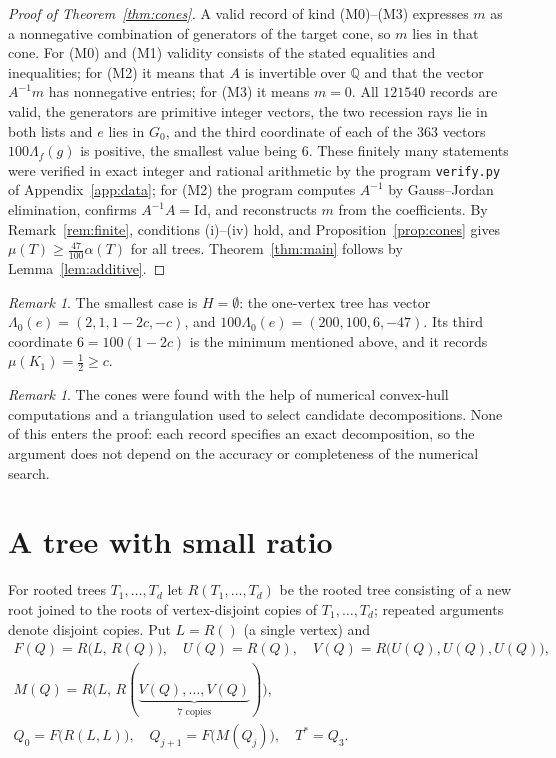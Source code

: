 \documentclass{amsart}
\numberwithin{equation}{section}
\theoremstyle{plain}
\theoremstyle{definition}
\theoremstyle{remark}
\newtheorem{remark}[theorem]{Remark}
\begin{document}
\begin{proof}[Proof of Theorem~\textup{\ref{thm:cones}}]
A valid record of kind (M0)--(M3) expresses $m$ as a nonnegative combination of generators of the target cone, so $m$ lies in that cone. For (M0) and (M1) validity consists of the stated equalities and inequalities; for (M2) it means that $A$ is invertible over $\mathbb Q$ and that the vector $A^{-1}m$ has nonnegative entries; for (M3) it means $m=0$. All $121540$ records are valid, the generators are primitive integer vectors, the two recession rays lie in both lists and $e$ lies in $G_0$, and the third coordinate of each of the $363$ vectors $100\Lambda_f(g)$ is positive, the smallest value being $6$. These finitely many statements were verified in exact integer and rational arithmetic by the program \texttt{verify.py} of Appendix~\ref{app:data}; for (M2) the program computes $A^{-1}$ by Gauss--Jordan elimination, confirms $A^{-1}A=\mathrm{Id}$, and reconstructs $m$ from the coefficients. By Remark~\ref{rem:finite}, conditions (i)--(iv) hold, and Proposition~\ref{prop:cones} gives $\mu(T)\ge\frac{47}{100}\alpha(T)$ for all trees. Theorem~\ref{thm:main} follows by Lemma~\ref{lem:additive}.
\end{proof}

\begin{remark}\label{rem:example}
The smallest case is $H=\emptyset$: the one-vertex tree has vector $\Lambda_0(e)=(2,1,1-2c,-c)$, and $100\Lambda_0(e)=(200,100,6,-47)$. Its third coordinate $6=100(1-2c)$ is the minimum mentioned above, and it records $\mu(K_1)=\frac12\ge c$.
\end{remark}

\begin{remark}
The cones were found with the help of numerical convex-hull computations and a triangulation used to select candidate decompositions. None of this enters the proof: each record specifies an exact decomposition, so the argument does not depend on the accuracy or completeness of the numerical search.
\end{remark}

\section{A tree with small ratio}\label{sec:witness}

For rooted trees $T_1,\dots,T_d$ let $R(T_1,\dots,T_d)$ be the rooted tree consisting of a new root joined to the roots of vertex-disjoint copies of $T_1,\dots,T_d$; repeated arguments denote disjoint copies. Put $L=R()$ (a single vertex) and
\begin{equation}\label{eq:witness}
\begin{gathered}
F(Q)=R\bigl(L,\,R(Q)\bigr),\quad U(Q)=R(Q),\quad V(Q)=R\bigl(U(Q),U(Q),U(Q)\bigr),\\
M(Q)=R\bigl(L,\,R(\underbrace{V(Q),\dots,V(Q)}_{7\text{ copies}})\bigr),\\
Q_0=F\bigl(R(L,L)\bigr),\quad Q_{j+1}=F\bigl(M(Q_j)\bigr),\quad T^*=Q_3 .
\end{gathered}
\end{equation}
\end{document}
